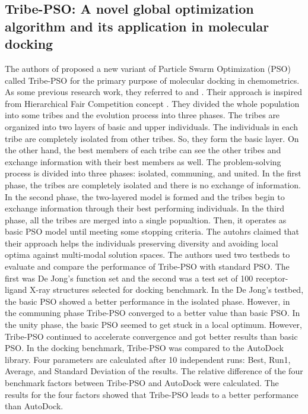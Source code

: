 \subsection{Tribe-PSO: A novel global optimization algorithm and its application in molecular docking}
The authors of \cite{chen2006tribe} proposed a new variant of Particle Swarm Optimization (PSO) called Tribe-PSO for the primary purpose of molecular docking in chemometrics. As some previous research work, they referred to \cite{jones1997development} and \cite{clerc2002particle}. Their approach is inspired from Hierarchical Fair Competition concept \cite{jianjun2002adaptive}. They divided the whole population into some tribes and the evolution process into three phases. The tribes are organized into two layers of basic and upper individuals. \newline The individuals in each tribe are completely isolated from other tribes. So, they form the basic layer. On the other hand, the best members of each tribe can see the other tribes and exchange information with their best members as well. The problem-solving process is divided into three phases: isolated, communing, and united. In the first phase, the tribes are completely isolated and there is no exchange of information. In the second phase, the two-layered model is formed and the tribes begin to exchange information through their best performing individuals. In the third phase, all the tribes are merged into a single popualtion. Then, it operates as basic PSO model until meeting some stopping criteria. The autohrs claimed that their approach helps the individuals preserving diversity and avoiding local optima against multi-modal solution spaces.\newline
The authors used two testbeds to evaluate and compare the performance of Tribe-PSO with standard PSO. The first was De Jong's function set and the second was a test set of 100 receptor-ligand X-ray structures selected for docking benchmark. In the De Jong's testbed, the basic PSO showed a better performance in the isolated phase. However, in the communing phase Tribe-PSO converged to a better value than basic PSO. In the unity phase, the basic PSO seemed to get stuck in a local optimum. However, Tribe-PSO continued to accelerate convergence and got better results than basic PSO. In the docking benchmark, Tribe-PSO was compared to the AutoDock library. Four parameters are calculated after 10 independent runs: Best, Run1, Average, and Standard Deviation of the results. The relative difference of the four benchmark factors between Tribe-PSO and AutoDock were calculated. The results for the four factors showed that Tribe-PSO leads to a better performance than AutoDock.
